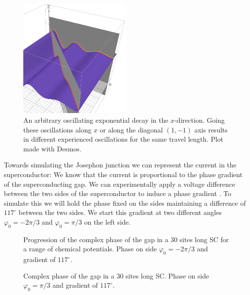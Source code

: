 \documentclass[..\main.tex]{subfile}
\begin{document}
\begin{figure}[H]
  \centering
  \includegraphics[width=0.5\textwidth]{Ressources/CooperPairsOrient.PNG}
  \caption{An arbitrary oscillating exponential decay in the $x$-direction. Going these oscillations along $x$ or along the diagonal $(1,-1)$ axis results in different
  experienced oscillations for the same travel length. Plot made with Desmos.}
\end{figure}
Towards simulating the Josephon junction we can represent the current in the superconductor:  
We know  that the current is proportional to the phase gradient of the superconducting gap.
We can experimentally apply a voltage difference between the two sides of the superconductor to induce a phase gradient .
To simulate this we will hold the phase fixed on the sides maintaining a difference of $117^{\circ}$ between the two sides.
We start this gradient at two different angles $\varphi_0 = -2\pi/3$ and $\varphi_0 = \pi/3$ on the left side.
\begin{figure}[H]
    
    \caption{Progression of the complex phase of the gap in a 30 sites long SC for a range of chemical potentials.
     Phase on side $\varphi_0 = -2\pi/3$ and gradient of $117^{\circ}$.}
    \label{fig:Phase-2pi3}
\end{figure}
\begin{figure}[H]
    
    \caption{Complex phase of the gap in a 30 sites long SC. Phase on side $\varphi_0 = \pi/3$ and gradient of $117^{\circ}$.}
    \label{fig:Phasepi3}
\end{figure}
\end{document}
